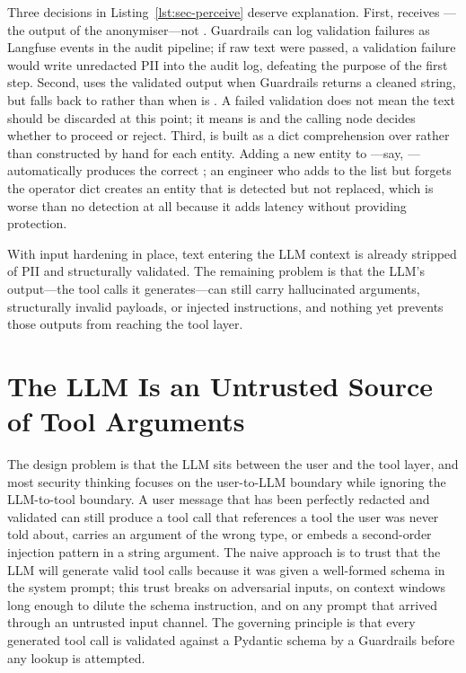 Three decisions in Listing~\ref{lst:sec-perceive} deserve explanation.
First,  receives ---the output of
the anonymiser---not . Guardrails can log validation
failures as Langfuse events in the audit pipeline; if raw text were
passed, a validation failure would write unredacted PII into the audit
log, defeating the purpose of the first step. Second,
 uses the validated output
when Guardrails returns a cleaned string, but falls back to
 rather than  when
 is . A failed validation does not
mean the text should be discarded at this point; it means
 is  and the calling node decides
whether to proceed or reject. Third,  is
built as a dict comprehension over  rather than
constructed by hand for each entity. Adding a new entity to
---say, ---automatically
produces the correct ; an engineer who adds to
the list but forgets the operator dict creates an entity that is
detected but not replaced, which is worse than no detection at all
because it adds latency without providing protection.

With input hardening in place, text entering the LLM context is
already stripped of PII and structurally validated. The remaining
problem is that the LLM's output---the tool calls it generates---can
still carry hallucinated arguments, structurally invalid payloads, or
injected instructions, and nothing yet prevents those outputs from
reaching the tool layer.


\section{The LLM Is an Untrusted Source of Tool Arguments}
\label{sec:sec-output}

The design problem is that the LLM sits between the user and the tool
layer, and most security thinking focuses on the user-to-LLM boundary
while ignoring the LLM-to-tool boundary. A user message that has been
perfectly redacted and validated can still produce a tool call that
references a tool the user was never told about, carries an argument of
the wrong type, or embeds a second-order injection pattern in a string
argument. The naive approach is to trust that the LLM will generate
valid tool calls because it was given a well-formed schema in the
system prompt; this trust breaks on adversarial inputs, on context
windows long enough to dilute the schema instruction, and on any
prompt that arrived through an untrusted input channel. The governing
principle is that every generated tool call is validated against a
Pydantic schema by a Guardrails  before any
 lookup is attempted.

